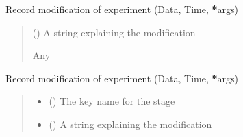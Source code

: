 \documentclass[letterpaper,10pt,english]{sphinxmanual}
\begin{document}
\begin{fulllineitems}
\begin{fulllineitems}
\label{\detokenize{ExperimentHierarchy:ExperimentHierarchy.ExperimentData.record_mod}}
\pysigstartsignatures
{}
\pysigstopsignatures
\sphinxAtStartPar
Record modification of experiment (Data, Time, {\color{red}\bfseries{}*}args)
\begin{quote}\begin{description}
\sphinxAtStartPar
{} () \textendash{} A string explaining the modification

\sphinxAtStartPar
Any

\end{description}\end{quote}

\end{fulllineitems}


\begin{fulllineitems}
\label{\detokenize{ExperimentHierarchy:ExperimentHierarchy.ExperimentData.record_stage_mod}}
\pysigstartsignatures
{}
\pysigstopsignatures
\sphinxAtStartPar
Record modification of experiment (Data, Time, {\color{red}\bfseries{}*}args)
\begin{quote}\begin{description}
\begin{itemize}
\item {} 
\sphinxAtStartPar
{} () \textendash{} The key name for the stage

\item {} 
\sphinxAtStartPar
{} () \textendash{} A string explaining the modification

\end{itemize}


\end{description}
\end{quote}
\end{fulllineitems}
\end{fulllineitems}
\end{document}
